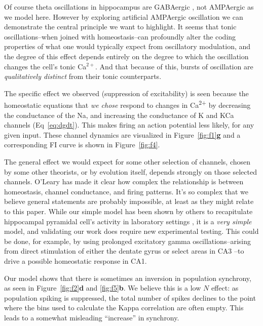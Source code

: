 \documentclass{article}
\begin{document}
Of course theta oscillations in hippocampus are GABAergic \cite{Colgin2016}, not AMPAergic as we model here. However by exploring artificial AMPAergic oscillation we can demonstrate the central principle we want to highlight. It seems that tonic oscillations--when joined with homeostasis--can profoundly alter the coding properties of what one would typically expect from oscillatory modulation, and the degree of this effect depends entirely on the degree to which the oscillation changes the cell's tonic Ca$^{2+}$. And that because of this, bursts of oscillation are \textit{qualitatively distinct} from their tonic counterparts.  

The specific effect we observed (suppression of excitability) is seen because the homeostatic equations that \textit{we chose} respond to changes in Ca\textsuperscript{2+} by decreasing the conductance of the Na, and increasing the conductance of K and KCa channels (Eq~\ref{eq:dgdt}). This makes firing an action potential less likely, for any given input. These channel dynamics are visualized in Figure~\ref{fig:f1}\textbf{g} and a corresponding FI curve is shown in Figure~\ref{fig:f4}. 

The general effect we would expect for some other selection of channels, chosen by some other theorists, or by evolution itself, depends strongly on those selected channels. O'Leary \cite{OLeary2014} has made it clear how complex the relationship is between homeostasis, channel conductance, and firing patterns. It's so complex that we believe general statements are probably impossible, at least as they might relate to this paper. While our simple model has been shown by others to recapitulate hippocampal pyramidal cell's activity in laboratory settings \cite{LeMasson1993}, it is a \textit{very simple} model, and validating our work does require new experimental testing. This could be done, for example, by using prolonged excitatory gamma oscillations--arising from direct stimulation of either the dentate gyrus or select areas in CA3 \cite{Csicsvari2003}--to drive a possible homeostatic response in CA1. 

Our model shows that there is sometimes an inversion in population synchrony, as seen in Figure~\ref{fig:f2}\textbf{d} and \ref{fig:f5}\textbf{b}. We believe this is a low $N$ effect: as population spiking is suppressed, the total number of spikes declines to the point where the bins used to calculate the Kappa correlation are often empty. This leads to a somewhat misleading ``increase'' in synchrony.
\end{document}
